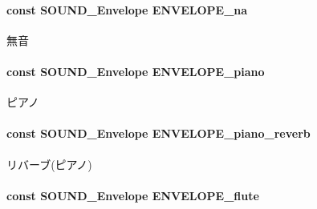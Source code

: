 \paragraph[{E\+N\+V\+E\+L\+O\+P\+E\+\_\+na}]{\setlength{\rightskip}{0pt plus 5cm}const {\bf S\+O\+U\+N\+D\+\_\+\+Envelope} E\+N\+V\+E\+L\+O\+P\+E\+\_\+na}\label{envelope_8h_a155d27ad170ccebc7a70c73de0c272fb_a155d27ad170ccebc7a70c73de0c272fb}


無音 

\paragraph[{E\+N\+V\+E\+L\+O\+P\+E\+\_\+piano}]{\setlength{\rightskip}{0pt plus 5cm}const {\bf S\+O\+U\+N\+D\+\_\+\+Envelope} E\+N\+V\+E\+L\+O\+P\+E\+\_\+piano}\label{envelope_8h_acb3b812bae69a00850c71f5327fac2e2_acb3b812bae69a00850c71f5327fac2e2}


ピアノ 

\paragraph[{E\+N\+V\+E\+L\+O\+P\+E\+\_\+piano\+\_\+reverb}]{\setlength{\rightskip}{0pt plus 5cm}const {\bf S\+O\+U\+N\+D\+\_\+\+Envelope} E\+N\+V\+E\+L\+O\+P\+E\+\_\+piano\+\_\+reverb}\label{envelope_8h_aef7f2e51b519928969cbf6bb8efca28b_aef7f2e51b519928969cbf6bb8efca28b}


リバーブ(ピアノ) 

\paragraph[{E\+N\+V\+E\+L\+O\+P\+E\+\_\+flute}]{\setlength{\rightskip}{0pt plus 5cm}const {\bf S\+O\+U\+N\+D\+\_\+\+Envelope} E\+N\+V\+E\+L\+O\+P\+E\+\_\+flute}\label{envelope_8h_ab2df1d6cfff8d64ac4c51583e5757db0_ab2df1d6cfff8d64ac4c51583e5757db0}


